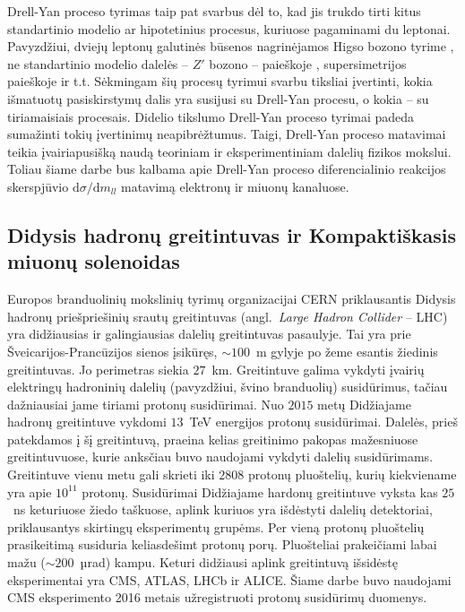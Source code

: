 \documentclass[a4paper, 12pt, oneside]{article}
\begin{document}
Drell-Yan proceso tyrimas taip pat svarbus dėl to, kad jis trukdo tirti kitus standartinio modelio ar hipotetinius procesus, kuriuose
pagaminami du leptonai.
Pavyzdžiui, dviejų leptonų galutinės būsenos nagrinėjamos Higso bozono tyrime \cite{Higgs2018}, ne standartinio modelio dalelės --
$Z'$ bozono -- paieškoje \cite{Zprime}, supersimetrijos paieškoje \cite{SUSYtau} ir t.t.
Sėkmingam šių procesų tyrimui svarbu tiksliai įvertinti, kokia išmatuotų pasiskirstymų dalis yra susijusi su Drell-Yan procesu, o
kokia -- su tiriamaisiais procesais.
Didelio tikslumo Drell-Yan proceso tyrimai padeda sumažinti tokių įvertinimų neapibrėžtumus.
Taigi, Drell-Yan proceso matavimai teikia įvairiapusišką naudą teoriniam ir eksperimentiniam dalelių fizikos mokslui.
Toliau šiame darbe bus kalbama apie Drell-Yan proceso diferencialinio reakcijos skerspjūvio $\mathrm{d}\sigma/\mathrm{d}m_{ll}$ matavimą
elektronų ir miuonų kanaluose.

\subsection{Didysis hadronų greitintuvas ir Kompaktiškasis miuonų solenoidas}
Europos branduolinių mokslinių tyrimų organizacijai CERN priklausantis Didysis hadronų priešpriešinių srautų
greitintuvas (angl.\ \textit{Large Hadron Collider} -- LHC) \cite{LHC} yra didžiausias ir galingiausias dalelių greitintuvas pasaulyje.
Tai yra prie Šveicarijos-Prancūzijos sienos įsikūręs, $\sim\!\!100$~m gylyje po žeme esantis žiedinis greitintuvas.
Jo perimetras siekia $27$~km.
Greitintuve galima vykdyti įvairių elektringų hadroninių dalelių (pavyzdžiui, švino branduolių) susidūrimus, tačiau dažniausiai jame
tiriami protonų susidūrimai.
Nuo $2015$ metų Didžiajame hadronų greitintuve vykdomi $13$~TeV energijos protonų susidūrimai.
Dalelės, prieš patekdamos į šį greitintuvą, praeina kelias greitinimo pakopas mažesniuose greitintuvuose, kurie anksčiau buvo
naudojami vykdyti dalelių susidūrimams.
Greitintuve vienu metu gali skrieti iki $2808$ protonų pluoštelių, kurių kiekviename yra apie $10^{11}$ protonų.
Susidūrimai Didžiajame hardonų greitintuve vyksta kas $25$~ns keturiuose žiedo taškuose, aplink kuriuos yra išdėstyti dalelių
detektoriai, priklausantys skirtingų eksperimentų grupėms.
Per vieną protonų pluoštelių prasikeitimą susiduria keliasdešimt protonų porų.
Pluošteliai prakeičiami labai mažu ($\sim\!\!200$~µrad) kampu.
Keturi didžiausi aplink greitintuvą išsidėstę eksperimentai yra CMS, ATLAS, LHCb ir ALICE.
Šiame darbe buvo naudojami CMS eksperimento 2016 metais užregistruoti protonų susidūrimų duomenys.
\end{document}
